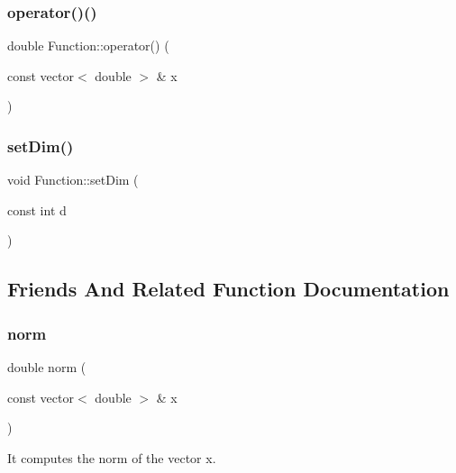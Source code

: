 \subsubsection{\texorpdfstring{operator()()}{operator()()}}
{\footnotesize\ttfamily double Function\+::operator() (\begin{DoxyParamCaption}\item[{const vector$<$ double $>$ \&}]{x }\end{DoxyParamCaption})}

\mbox{\label{class_function_a8c8f0ba3282431096ce7397c89357cef}} 
\subsubsection{\texorpdfstring{set\+Dim()}{setDim()}}
{\footnotesize\ttfamily void Function\+::set\+Dim (\begin{DoxyParamCaption}\item[{const int}]{d }\end{DoxyParamCaption})}



\subsection{Friends And Related Function Documentation}
\mbox{\label{class_function_a52e0aa61f3f38c1b981ad4c1deeebed5}} 
\subsubsection{\texorpdfstring{norm}{norm}}
{\footnotesize\ttfamily double norm (\begin{DoxyParamCaption}\item[{const vector$<$ double $>$ \&}]{x }\end{DoxyParamCaption})\hspace{0.3cm}{\ttfamily [friend]}}



It computes the norm of the vector x. 

\mbox{\label{class_function_a5c042028e918038808f0b9255d846bdc}} 
